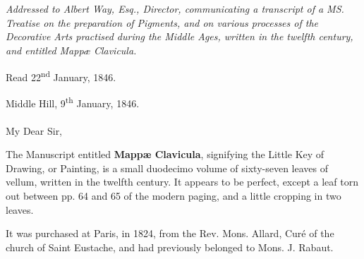 \documentclass[a4paper, 11pt, oneside, polutonikogreek, italian]{article}
\begin{document}
\section*{}
\begin{center}
\emph{Addressed to Albert Way, Esq., Director, communicating a transcript of a MS. Treatise on the preparation of Pigments, and on various processes of the Decorative Arts practised during the Middle Ages, written in the twelfth century, and entitled Mappæ Clavicula.}
\end{center}
\begin{center}
Read 22\textsuperscript{nd} January, 1846.

Middle Hill, 9\textsuperscript{th} January, 1846.
\end{center}
\paragraph{}
My Dear Sir,

The Manuscript entitled \textbf{Mappæ Clavicula}, signifying the Little Key of Drawing, or Painting, is a small duodecimo volume of sixty-seven leaves of vellum, written in the twelfth century. It appears to be perfect, except a leaf torn out between pp. 64 and 65 of the modern paging, and a little cropping in two leaves.

It was purchased at Paris, in 1824, from the Rev. Mons. Allard, Curé of the church of Saint Eustache, and had previously belonged to Mons. J. Rabaut.
\end{document}
